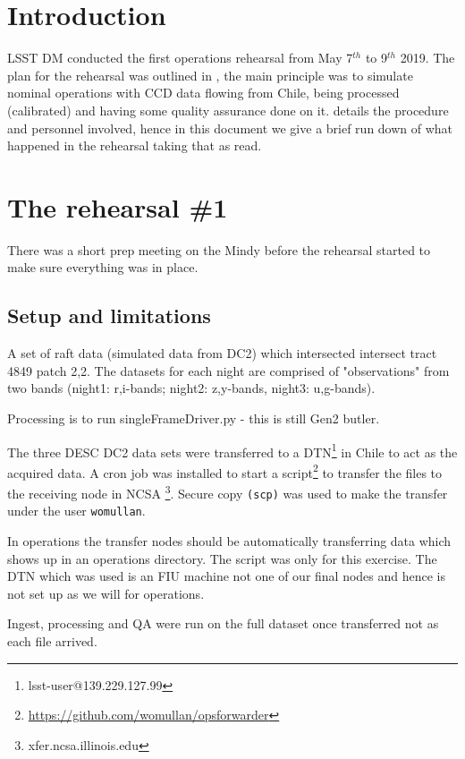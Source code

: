 \section{Introduction} \label{sec:intro}

LSST \gls{DM} conducted the first operations rehearsal from May 7$^{th}$ to 9$^{th}$ 2019.
The plan for the rehearsal was outlined in , the main principle was to simulate
nominal operations with \gls{CCD} data flowing from Chile, being processed (calibrated) and having some quality
assurance done on it.
 details the procedure and personnel involved,
hence in this document  we give a brief run down of what  happened in the rehearsal taking that as read.


\section{The rehearsal \#1}

There was a short prep meeting on the Mindy before the rehearsal started to make sure everything was in place.
\subsection{Setup and limitations} \label{sec:setup}



A set of raft data (simulated data from DC2) which intersected
intersect \gls{tract} 4849 \gls{patch} 2,2.  The datasets for each night are comprised
of "observations" from two bands (night1: r,i-bands;  night2: z,y-bands, night3: u,g-bands).

Processing is to run singleFrameDriver.py - this is still Gen2 butler.

The three \gls{DESC} DC2 data sets were transferred to a DTN\footnote{lsst-user@139.229.127.99} in Chile to act as the acquired data.
A cron job was installed to start a script\footnote{\url{https://github.com/womullan/opsforwarder}} to transfer the files to the receiving node in \gls{NCSA} \footnote{xfer.ncsa.illinois.edu}. Secure copy \texttt{(scp)}  was used to make the transfer under the user \texttt{womullan}.

In operations the transfer nodes should be automatically transferring data which shows up in an operations directory. The script was only for this exercise. The \gls{DTN} which was used is an \gls{FIU} machine not one of our final nodes and hence is not set up as we will for operations.

Ingest, processing and \gls{QA} were run on the full dataset once transferred not as each file arrived.

